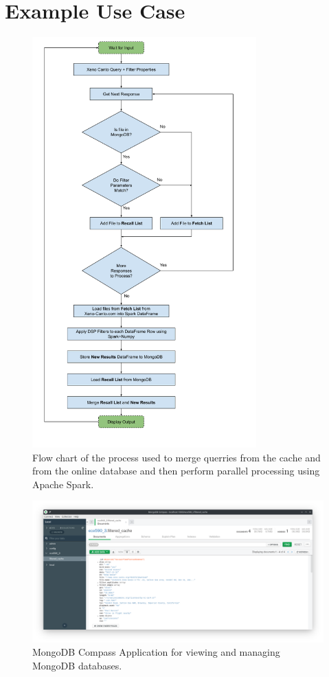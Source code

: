 \documentclass[conference,twoside]{IEEEtran}
\begin{document}
\section{Example Use Case}
\begin{figure}
  \centering
  \includegraphics[width=3.4in]{project_flow_chart}
  \caption{Flow chart of the process used to merge querries from the cache and from the online database and then perform parallel processing using Apache Spark.}
  \label{fig:flow}
\end{figure}



\begin{figure}  %
  \centering
  \includegraphics[width=\textwidth]{compass_screenshot}
  \caption{MongoDB Compass Application for viewing and managing MongoDB databases.}
  \label{fig:compass}
\end{figure}
\end{document}
